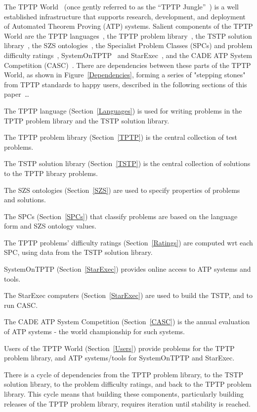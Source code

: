 \documentclass[runningheads]{llncs}
\newenvironment{packed_itemize}{
\vspace*{-0.2em}
\begin{itemize}
\setlength{\partopsep}{0pt}
\setlength{\itemsep}{1pt}
\setlength{\parskip}{0pt}
\setlength{\parsep}{0pt}
}{\end{itemize}}
\begin{document}
The TPTP World~\cite{Sut10,Sut17} (once gently referred to as the ``TPTP Jungle''~\cite{BU13}) is 
a well established infrastructure that supports research, development, and deployment of 
Automated Theorem Proving (ATP) systems.
Salient components of the TPTP World are
the TPTP languages~\cite{SS+06}, 
the TPTP problem library~\cite{Sut09}, 
the TSTP solution library~\cite{Sut10}, 
the SZS ontologies~\cite{Sut08-KEAPPA},
the Specialist Problem Classes (SPCs) and problem difficulty ratings~\cite{SS01},
SystemOnTPTP~\cite{Sut00-CADE-17} and StarExec~\cite{SST14},
and the CADE ATP System Competition (CASC)~\cite{Sut16}.
There are dependencies between these parts of the TPTP World, as shown in 
Figure~\ref{Dependencies}, forming a series of "stepping stones" from TPTP standards to 
happy users, described in the following sections of this paper~\ldots
\begin{packed_itemize}
\item The TPTP language (Section~\ref{Languages}) is used for writing problems in the TPTP
      problem library and the TSTP solution library.
\item The TPTP problem library (Section~\ref{TPTP}) is the central collection of test problems.
\item The TSTP solution library (Section~\ref{TSTP}) is the central collection of solutions
      to the TPTP library problems.
\item The SZS ontologies (Section~\ref{SZS}) are used to specify properties of problems
      and solutions.
\item The SPCs (Section~\ref{SPCs}) that classify problems are based on the language form 
      and SZS ontology values.
\item The TPTP problems' difficulty ratings (Section~\ref{Ratings}) are computed wrt each
      SPC, using data from the TSTP solution library.
\item SystemOnTPTP (Section~\ref{StarExec}) provides online access to ATP systems and tools.
\item The StarExec computers (Section~\ref{StarExec}) are used to build the TSTP, and to run
      CASC.
\item The CADE ATP System Competition (Section~\ref{CASC}) is the annual evaluation of 
      ATP systems - the world championship for such systems.
\item Users of the TPTP World (Section~\ref{Users}) provide problems for the TPTP problem
      library, and ATP systems/tools for SystemOnTPTP and StarExec.
\end{packed_itemize}
There is a cycle of dependencies from the TPTP problem library, to the TSTP solution 
library, to the problem difficulty ratings, and back to the TPTP problem library.
This cycle means that building these components, particularly building releases of the TPTP 
problem library, requires iteration until stability is reached.
\end{document}
